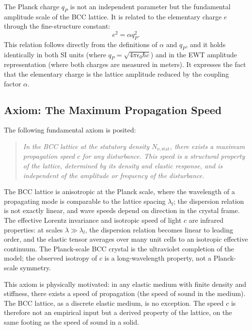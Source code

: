 \documentclass[10pt,a4paper]{article}
\begin{document}
The Planck charge \(q_P\) is not an independent parameter but the fundamental amplitude scale of the BCC lattice. It is related to the elementary charge \(e\) through the fine-structure constant:
\begin{equation}
	e^2 = \alpha q_P^2.
	\label{eq:e_alpha_qP}
\end{equation}
This relation follows directly from the definitions of \(\alpha\) and \(q_P\), and it holds identically in both SI units (where \(q_P = \sqrt{4\pi\epsilon_0\hbar c}\)) and in the EWT amplitude representation (where both charges are measured in meters). It expresses the fact that the elementary charge is the lattice amplitude reduced by the coupling factor \(\alpha\).

\subsection{Axiom: The Maximum Propagation Speed}

The following fundamental axiom is posited:

\begin{quote}
	\emph{In the BCC lattice at the statutory density \(N_{\nu,\text{stat}}\), there exists a maximum propagation speed \(c\) for any disturbance. This speed is a structural property of the lattice, determined by its density and elastic response, and is independent of the amplitude or frequency of the disturbance.}
\end{quote}

The BCC lattice is anisotropic at the Planck scale, where the
wavelength of a propagating mode is comparable to the lattice spacing
$\lambda_l$; the dispersion relation is not exactly linear, and wave
speeds depend on direction in the crystal frame. The effective Lorentz
invariance and isotropic speed of light $c$ are infrared properties: at
scales $\lambda \gg \lambda_l$, the dispersion relation becomes linear
to leading order, and the elastic tensor averages over many unit cells
to an isotropic effective continuum. The Planck-scale BCC crystal is
the ultraviolet completion of the model; the observed isotropy of $c$
is a long-wavelength property, not a Planck-scale symmetry.

This axiom is physically motivated: in any elastic medium with finite density and stiffness, there exists a speed of propagation (the speed of sound in the medium). The BCC lattice, as a discrete elastic medium, is no exception. The speed \(c\) is therefore not an empirical input but a derived property of the lattice, on the same footing as the speed of sound in a solid.
\end{document}
